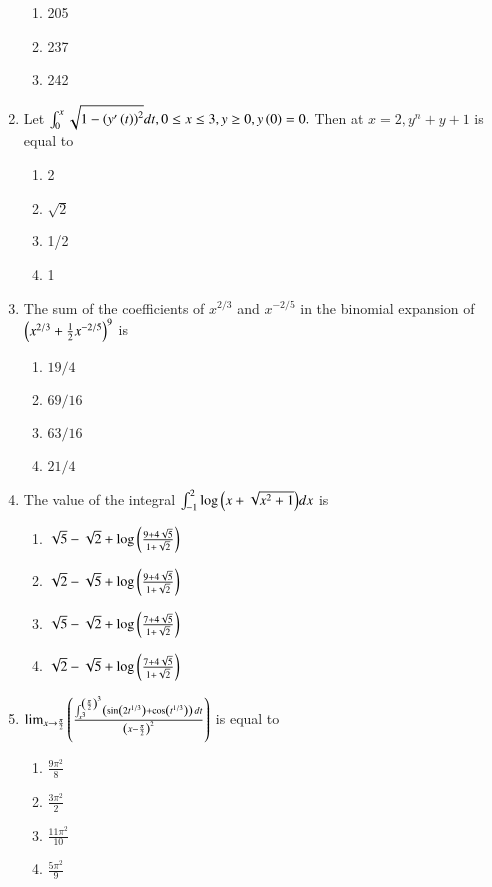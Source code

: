 \documentclass[journal]{IEEEtran}
\numberwithin{equation}{enumi}
\numberwithin{figure}{enumi}
\begin{document}
\begin{enumerate}
\begin{enumerate}
        \item 205
        \item 237
        \item 242
    \end{enumerate}
    \item Let $\int_0^x\sqrt{1-\left(y^{\prime}\left(t\right)\right)^2}dt, 0\leq x \leq 3,y\geq 0,y\left(0\right)=0.$ Then at $x=2,y^n+y+1$ is equal to
    \begin{enumerate}
        \item 2
        \item $\sqrt{2}$
        \item 1/2
        \item 1
    \end{enumerate}
    \item The sum of the coefficients of $x^{2/3}$ and $x^{-2/5}$ in the binomial expansion of $\left(x^{2/3}+\frac{1}{2}x^{-2/5}\right)^9$ is
    \begin{enumerate}
        \item $19/4$
        \item $69/16$
        \item $63/16$
        \item $21/4$
    \end{enumerate}
    \item The value of the integral $\int_{-1}^{2} \log{\ensuremath{\left(x + \sqrt{x^{2}+1}\right)}} dx$ is
    \begin{enumerate}
        \item $\sqrt{5}-\sqrt{2}+\log{\ensuremath{\left(\frac{9+4\sqrt{5}}{1+\sqrt{2}}\right)}}$
        \item $\sqrt{2}-\sqrt{5}+\log{\ensuremath{\left(\frac{9+4\sqrt{5}}{1+\sqrt{2}}\right)}}$
        \item $\sqrt{5}-\sqrt{2}+\log{\ensuremath{\left(\frac{7+4\sqrt{5}}{1+\sqrt{2}}\right)}}$
        \item $\sqrt{2}-\sqrt{5}+\log{\ensuremath{\left(\frac{7+4\sqrt{5}}{1+\sqrt{2}}\right)}}$
    \end{enumerate}
    \item $\lim_{x \to \frac{\pi}{2}} \left( \frac{\int_{x^3}^{\left( \frac{\pi}{2} \right)^3} \left( \sin \left( 2t^{1/3} \right) + \cos \left( t^{1/3} \right) \right) \, dt }{\left(x - \frac{\pi}{2}\right)^2} \right)$ is equal to
    \begin{enumerate}
        \item $\frac{9\pi^2}{8}$
        \item $\frac{3\pi^2}{2}$
        \item $\frac{11\pi^2}{10}$
        \item $\frac{5\pi^2}{9}$

\end{enumerate}
\end{enumerate}
\end{document}
